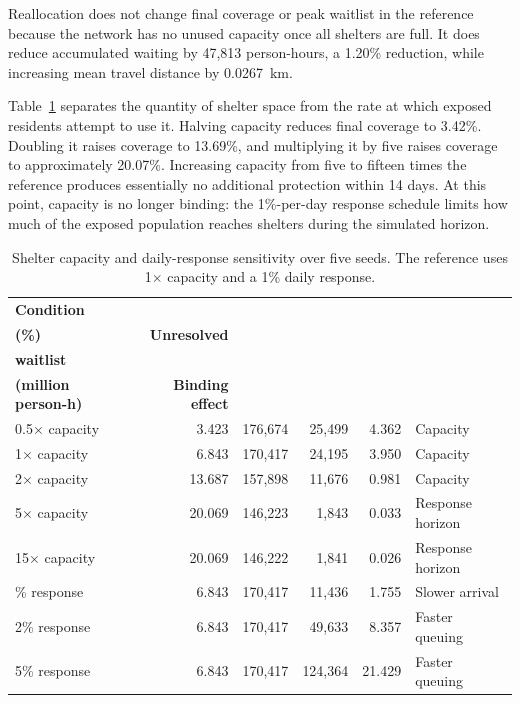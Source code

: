 Reallocation does not change final coverage or peak waitlist in the reference because the network has no unused capacity once all shelters are full. It does reduce accumulated waiting by 47,813 person-hours, a 1.20\% reduction, while increasing mean travel distance by 0.0267~km.

Table~\ref{tbl:shelter_capacity_response} separates the quantity of shelter space from the rate at which exposed residents attempt to use it. Halving capacity reduces final coverage to 3.42\%. Doubling it raises coverage to 13.69\%, and multiplying it by five raises coverage to approximately 20.07\%. Increasing capacity from five to fifteen times the reference produces essentially no additional protection within 14 days. At this point, capacity is no longer binding: the 1\%-per-day response schedule limits how much of the exposed population reaches shelters during the simulated horizon.

\begin{table}[ht]
\centering
\footnotesize
\caption{Shelter capacity and daily-response sensitivity over five seeds. The reference uses 1$\times$ capacity and a 1\% daily response.}
\label{tbl:shelter_capacity_response}
\begin{tabularx}{\linewidth}{@{}lrrrrX@{}}
\toprule
\textbf{Condition} &
\shortstack{\textbf{Coverage}\\\textbf{(\%)}} &
\textbf{Unresolved} &
\shortstack{\textbf{Peak}\\\textbf{waitlist}} &
\shortstack{\textbf{Waiting}\\\textbf{(million person-h)}} &
\textbf{Binding effect} \\
\midrule
0.5$\times$ capacity & 3.423 & 176,674 & 25,499 & 4.362 & Capacity \\
1$\times$ capacity  & 6.843 & 170,417 & 24,195 & 3.950 & Capacity \\
2$\times$ capacity  & 13.687 & 157,898 & 11,676 & 0.981 & Capacity \\
5$\times$ capacity  & 20.069 & 146,223 & 1,843 & 0.033 & Response horizon \\
15$\times$ capacity & 20.069 & 146,222 & 1,841 & 0.026 & Response horizon \\
\addlinespace
0.5\% response & 6.843 & 170,417 & 11,436 & 1.755 & Slower arrival \\
2\% response   & 6.843 & 170,417 & 49,633 & 8.357 & Faster queuing \\
5\% response   & 6.843 & 170,417 & 124,364 & 21.429 & Faster queuing \\
\bottomrule
\end{tabularx}
\end{table}

